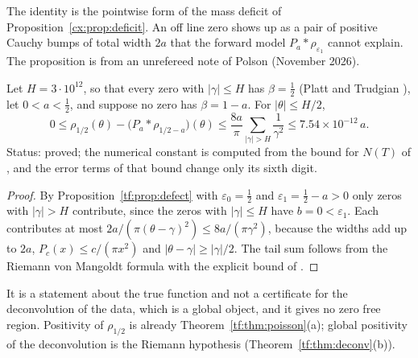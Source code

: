 The identity is the pointwise form of the mass deficit of Proposition~\ref{cx:prop:deficit}. An off line zero shows up as a pair of positive Cauchy bumps of total width $2a$ that the forward model $P_a*\rho_{\varepsilon_1}$ cannot explain. The proposition is from an unrefereed note of Polson (November 2026).

\begin{proposition}\label{tf:prop:local}
Let $H=3\cdot10^{12}$, so that every zero with $|\gamma|\le H$ has $\beta=\tfrac12$ (Platt and Trudgian \cite{PT21}), let $0<a<\tfrac12$, and suppose no zero has $\beta=1-a$. For $|\theta|\le H/2$,
\[
0\le\rho_{1/2}(\theta)-\bigl(P_a*\rho_{1/2-a}\bigr)(\theta)\le\frac{8a}\pi\sum_{|\gamma|>H}\frac1{\gamma^2}\le7.54\times10^{-12}\,a .
\]
Status: proved; the numerical constant is computed from the bound for $N(T)$ of \cite{HSW22}, and the error terms of that bound change only its sixth digit.
\end{proposition}

\begin{proof}
By Proposition~\ref{tf:prop:defect} with $\varepsilon_0=\tfrac12$ and $\varepsilon_1=\tfrac12-a>0$ only zeros with $|\gamma|>H$ contribute, since the zeros with $|\gamma|\le H$ have $b=0<\varepsilon_1$. Each contributes at most $2a/(\pi(\theta-\gamma)^2)\le8a/(\pi\gamma^2)$, because the widths add up to $2a$, $P_c(x)\le c/(\pi x^2)$ and $|\theta-\gamma|\ge|\gamma|/2$. The tail sum follows from the Riemann von Mangoldt formula with the explicit bound of \cite{HSW22}.
\end{proof}

It is a statement about the true function and not a certificate for the deconvolution of the data, which is a global object, and it gives no zero free region. Positivity of $\rho_{1/2}$ is already Theorem~\ref{tf:thm:poisson}(a); global positivity of the deconvolution is the Riemann hypothesis (Theorem~\ref{tf:thm:deconv}(b)).

